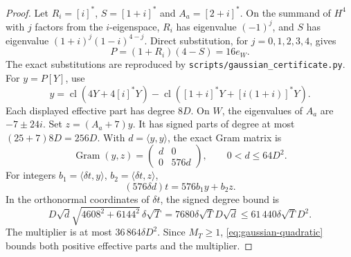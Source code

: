 \begin{proof}
Let $R_i=[i]^*$, $S=[1+i]^*$ and $A_a=[2+i]^*$. On the summand of $H^4$ with $j$ factors from the $i$-eigenspace, $R_i$ has eigenvalue $(-1)^j$, and $S$ has eigenvalue $(1+i)^j(1-i)^{4-j}$. Direct substitution, for $j=0,1,2,3,4$, gives
\[
 P=(1+R_i)(4-S)=16e_W.
\]
The exact substitutions are reproduced by \texttt{scripts/gaussian\_certificate.py}. For $y=P[Y]$, use
\[
 y=\operatorname{cl}(4Y+4[i]^*Y)-\operatorname{cl}([1+i]^*Y+[i(1+i)]^*Y).
\]
Each displayed effective part has degree $8D$. On $W$, the eigenvalues of $A_a$ are $-7\pm24i$. Set $z=(A_a+7)y$. It has signed parts of degree at most $(25+7)8D=256D$. With $d=\langle y,y\rangle$, the exact Gram matrix is
\[
 \operatorname{Gram}(y,z)=\begin{pmatrix}d&0\\0&576d\end{pmatrix},
 \qquad 0<d\le64D^2.
\]
For integers $b_1=\langle\delta t,y\rangle$, $b_2=\langle\delta t,z\rangle$,
\[
 (576\delta d)t=576b_1y+b_2z.
\]
In the orthonormal coordinates of $\delta t$, the signed degree bound is
\[
 D\sqrt d\sqrt{4608^2+6144^2}\,\delta\sqrt T
 =7680\delta\sqrt T D\sqrt d
 \le61\,440\delta\sqrt T D^2.
\]
The multiplier is at most $36\,864\delta D^2$. Since $M_T\ge1$, \eqref{eq:gaussian-quadratic} bounds both positive effective parts and the multiplier.
\end{proof}
